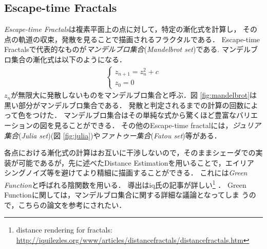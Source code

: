 \subsection{Escape-time Fractals}
{\it Escape-time Fractals}は複素平面上の点に対して，特定の漸化式を計算し，
その点の軌道の収束，発散を見ることで描画されるフラクタルである．
Escape-time Fractalsで代表的なものが\emph{マンデルブロ集合}({\it Mandelbrot set})である.
マンデルブロ集合の漸化式は以下のようになる．
\begin{eqnarray*}
 \begin{cases}
  z_{n+1} = z^2_{n} + c \\ z_0 = 0
 \end{cases}
\end{eqnarray*}
$z_n$が無限大に発散しないものをマンデルブロ集合と呼ぶ．図
\ref{fig:mandelbrot}は黒い部分がマンデルブロ集合である．
発散と判定されるまでの計算の回数によって色をつけた．
マンデルブロ集合はその単純な式から驚くほど豊富なバリエーションの図を見ることができる．
その他のEscape-time fractalには，\emph{ジュリア集合}({\it Julia set})(図
\ref{fig:julia})や\emph{ファトゥー集合}({\it Fatou set})等がある．

各点における漸化式の計算はお互いに干渉しないので，そのままシェーダでの実
装が可能であるが，先に述べたDistance Estimationを用いることで，エイリア
シングノイズ等を避けてより精細に描画することができる．
これには{\it Green Function}と呼ばれる陰関数を用いる．
導出はiq氏の記事が詳しい\footnote{distance rendering for fractals:
\url{http://iquilezles.org/www/articles/distancefractals/distancefractals.htm}}
．
Green Functionに関しては，マンデルブロ集合に関する詳細な議論となってしま
うので，こちらの論文\cite{mandelbrot}を参考にされたい．

